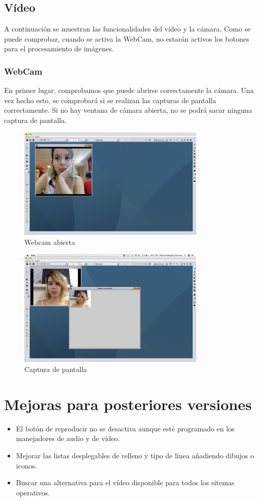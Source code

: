 \subsection{Vídeo}
A continuación se muestran las funcionalidades del vídeo y la cámara. Como se puede comprobar, cuando se activa la WebCam, no estarán activos los botones para el procesamiento de imágenes.
\subsubsection{WebCam}
En primer lugar, comprobamos que puede abrirse correctamente la cámara. Una vez hecho esto, se comprobará si se realizan las capturas de pantalla correctamente. Si no hay ventana de cámara abierta, no se podrá sacar ninguna captura de pantalla.
\vskip0.3cm
\begin{figure}[H]
 \centering
  \includegraphics[width=0.8\textwidth]{video/webcam.jpg}
 \caption{Webcam abierta}
 \label{diseño}
 \end{figure}
 \vskip0.3cm
\begin{figure}[H]
 \centering
  \includegraphics[width=0.8\textwidth]{video/captura.jpg}
 \caption{Captura de pantalla}
 \label{diseño}
 \end{figure}
 
\section{Mejoras para posteriores versiones}
\begin{itemize}
\item{El botón de reproducir no se desactiva aunque esté programado en los manejadores de audio y de vídeo.}
\item{Mejorar las listas desplegables de relleno y tipo de línea añadiendo dibujos o iconos.}
\item{Buscar una alternativa para el vídeo disponible para todos los sitemas operativos.}
\end{itemize}

